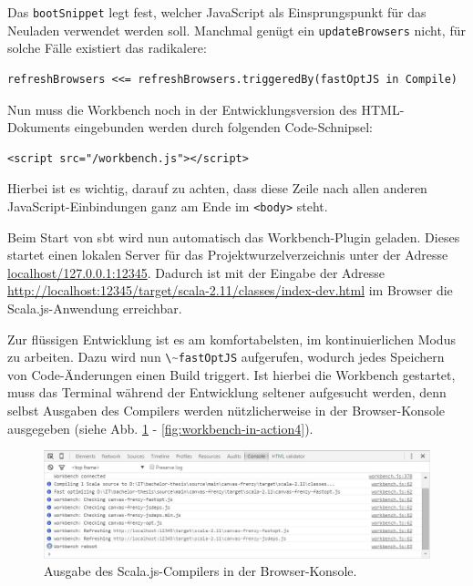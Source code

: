 \documentclass[a4paper, 12pt, hidelinks, listof=totoc, listoftables=totoc, bibliography=totoc]{scrreprt}
\newcommand{\code}[1]{\lstinline[language=Scala, style=inline]|#1|}
\newcommand{\html}[1]{\lstinline[language=HTML5, style=inline]|#1|}
\begin{document}
Das \code{bootSnippet} legt fest, welcher JavaScript als Einsprungspunkt für das Neuladen verwendet werden soll. Manchmal genügt ein \code{updateBrowsers} nicht, für solche Fälle existiert das radikalere:

\begin{lstlisting}[style=snippet]
refreshBrowsers <<= refreshBrowsers.triggeredBy(fastOptJS in Compile)
\end{lstlisting}

Nun muss die Workbench noch in der Entwicklungsversion des \ac{HTML}-Dokuments eingebunden werden durch folgenden Code-Schnipsel:

\begin{lstlisting}[language=HTML5, style=snippet]
<script src="/workbench.js"></script>
\end{lstlisting}

Hierbei ist es wichtig, darauf zu achten, dass diese Zeile nach allen anderen JavaScript-Einbindungen ganz am Ende im \html{<body>} steht.

Beim Start von sbt wird nun automatisch das Workbench-Plugin geladen. Dieses startet einen lokalen Server für das Projektwurzelverzeichnis unter der Adresse \url{localhost/127.0.0.1:12345}. Dadurch ist mit der Eingabe der Adresse \url{http://localhost:12345/target/scala-2.11/classes/index-dev.html} im Browser die Scala.js-Anwendung erreichbar.

Zur flüssigen Entwicklung ist es am komfortabelsten, im kontinuierlichen Modus zu arbeiten. Dazu wird nun \code{\~fastOptJS} aufgerufen, wodurch jedes Speichern von Code-Änderungen einen Build triggert. Ist hierbei die Workbench gestartet, muss das Terminal während der Entwicklung seltener aufgesucht werden, denn selbst Ausgaben des Compilers werden nützlicherweise in der Browser-Konsole ausgegeben (siehe Abb. \ref{fig:workbench-in-action1} - \ref{fig:workbench-in-action4}).

\begin{figure}[!h]
    \centering
    \includegraphics[width=1.0\textwidth]{workbench-in-action1}
    \caption{Ausgabe des Scala.js-Compilers in der Browser-Konsole.}
    \label{fig:workbench-in-action1}
\end{figure}
\end{document}
